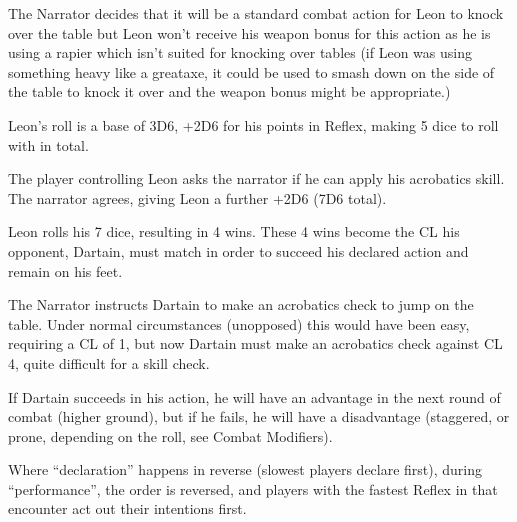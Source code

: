 \begin{displayquote}
    The Narrator decides that it will be a standard combat action for Leon to knock over the table but Leon won't receive his weapon bonus for this action as he is using a rapier which isn't suited for knocking over tables (if Leon was using something heavy like a greataxe, it could be used to smash down on the side of the table to knock it over and the weapon bonus might be appropriate.)

    Leon's roll is a base of 3D6, +2D6 for his points in Reflex, making 5 dice to roll with in total.

    The player controlling Leon asks the narrator if he can apply his acrobatics skill. The narrator agrees, giving Leon a further +2D6 (7D6 total).

    Leon rolls his 7 dice, resulting in 4 wins. These 4 wins become the CL his opponent, Dartain, must match in order to succeed his declared action and remain on his feet.

    The Narrator instructs Dartain to make an acrobatics check to jump on the table. Under normal circumstances (unopposed) this would have been easy, requiring a CL of 1, but now Dartain must make an acrobatics check against CL 4, quite difficult for a skill check.

    If Dartain succeeds in his action, he will have an advantage in the next round of combat (higher ground), but if he fails, he will have a disadvantage (staggered, or prone, depending on the roll, see Combat Modifiers).
\end{displayquote}

Where “declaration” happens in reverse (slowest players declare first), during “performance”, the order is reversed, and players with the fastest Reflex in that encounter act out their intentions first.